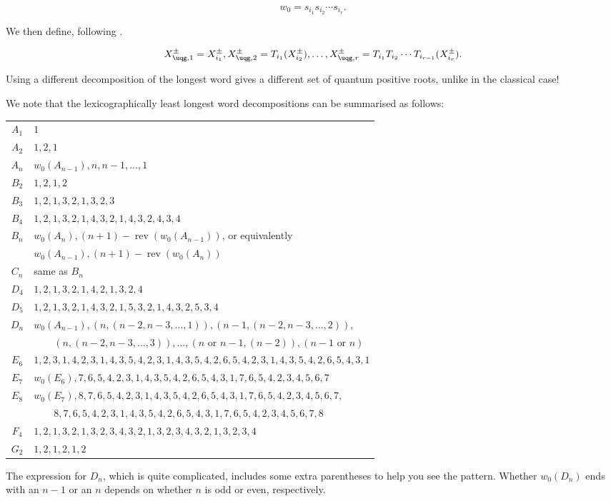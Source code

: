 $$ w_0 = s_{i_1} s_{i_2} \cdots s_{i_r}.$$

We then define, following \cite{CP}.

$$X_{\uqg, 1}^\pm = X_{i_1}^\pm, X_{\uqg, 2}^\pm = T_{i_1}(X_{i_2}^\pm), \ldots, X_{\uqg, r}^\pm = T_{i_1}T_{i_2}\cdots T_{i_{r-1}}(X_{i_r}^\pm).$$

Using a different decomposition of the longest word gives a different set of quantum positive roots, unlike in the classical case! \cite[\S8.1B]{CP}

We note that the lexicographically least longest word decompositions can be summarised as follows:
\begin{center}
\begin{tabular}{c|l}
$A_1$ & $1$ \\
$A_2$ & $1,2,1$ \\
$A_n$ & $w_0(A_{n-1}),n,n-1,\ldots,1$ \\
$B_2$ & $1,2,1,2$ \\
$B_3$ & $1,2,1,3,2,1,3,2,3$ \\
$B_4$ & $1,2,1,3,2,1,4,3,2,1,4,3,2,4,3,4$ \\
$B_n$ & $w_0(A_n),(n+1)-\operatorname{rev}(w_0(A_{n-1}))$, or equivalently\\
      & $w_0(A_{n-1}),(n+1)-\operatorname{rev}(w_0(A_n))$ \\
$C_n$ & same as $B_n$ \\
$D_4$ & $1,2,1,3,2,1,4,2,1,3,2,4$ \\
$D_5$ & $1,2,1,3,2,1,4,3,2,1,5,3,2,1,4,3,2,5,3,4$ \\
$D_n$ & $w_0(A_{n-1}),(n,(n-2,n-3,\ldots,1)),(n-1,(n-2,n-3,\ldots,2)),$ \\
      & $\qquad(n,(n-2,n-3,\ldots,3)),\ldots,(n\text{ or }n-1,(n-2)),(n-1\text{ or }n)$ \\
$E_6$ & $1,2,3,1,4,2,3,1,4,3,5,4,2,3,1,4,3,5,4,2,6,5,4,2,3,1,4,3,5,4,2,6,5,4,3,1$\\
$E_7$ & $w_0(E_6), 7, 6, 5, 4, 2, 3, 1, 4, 3, 5, 4, 2, 6, 5, 4, 3, 1, 7, 6, 5, 4, 2, 3, 4, 5, 6, 7$ \\
$E_8$ & $w_0(E_7), 8, 7, 6, 5, 4, 2, 3, 1, 4, 3, 5, 4, 2, 6, 5, 4, 3, 1, 7, 6, 5, 4, 2, 3, 4, 5, 6, 7, $ \\
      & $\qquad    8, 7, 6, 5, 4, 2, 3, 1, 4, 3, 5, 4, 2, 6, 5, 4, 3, 1, 7, 6, 5, 4, 2, 3, 4, 5, 6, 7, 8$ \\
$F_4$ & $1,2,1,3,2,1,3,2,3,4,3,2,1,3,2,3,4,3,2,1,3,2,3,4$ \\
$G_2$ & $1,2,1,2,1,2$
\end{tabular}
\end{center}
The expression for $D_n$, which is quite complicated, includes some extra parentheses to help you see the pattern. Whether $w_0(D_n)$ ends with an
$n-1$ or an $n$ depends on whether $n$ is odd or even, respectively.

